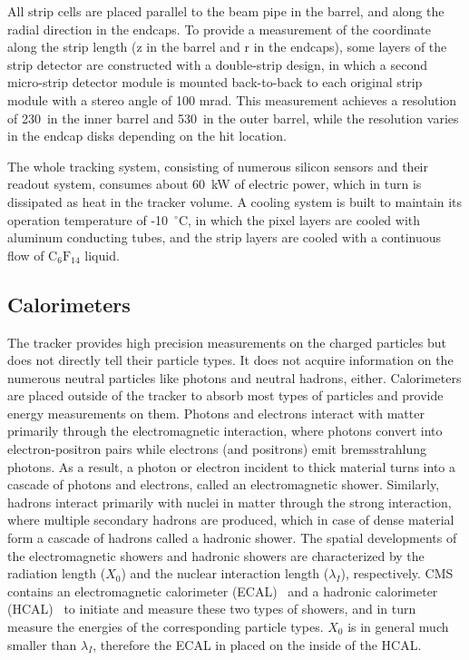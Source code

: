 All strip cells are placed parallel to the beam pipe in the barrel, and along the radial direction in the endcaps.
To provide a measurement of the coordinate along the strip length (z in the barrel and r in the endcaps),
some layers of the strip detector are constructed with a double-strip design, 
in which a second micro-strip detector module is mounted back-to-back to each original strip module with a stereo angle of 100 mrad. 
This measurement achieves a resolution of 230~\mum in the inner barrel and 530~\mum in the outer barrel, 
while the resolution varies in the endcap disks depending on the hit location.

The whole tracking system, consisting of numerous silicon sensors and their readout system,
consumes about 60~kW of electric power, which in turn is dissipated as heat in the tracker volume.
A cooling system is built to maintain its operation temperature of -10~${}^{\circ}$C, 
in which the pixel layers are cooled with aluminum conducting tubes, 
and the strip layers are cooled with a continuous flow of $\text{C}_{6}\text{F}_{14}$ liquid.


\subsection{Calorimeters}\label{sec:calos}

The tracker provides high precision measurements on the charged particles but does not directly tell their particle types.
It does not acquire information on the numerous neutral particles like photons and neutral hadrons, either.
Calorimeters are placed outside of the tracker to absorb most types of particles and provide energy measurements on them.
Photons and electrons interact with matter primarily through the electromagnetic interaction, 
where photons convert into electron-positron pairs while electrons (and positrons) emit bremsstrahlung photons.
As a result, a photon or electron incident to thick material turns into a cascade of photons and electrons, called an electromagnetic shower.
Similarly, hadrons interact primarily with nuclei in matter through the strong interaction,
where multiple secondary hadrons are produced, which in case of dense material form a cascade of hadrons called a hadronic shower.
The spatial developments of the electromagnetic showers and hadronic showers are characterized by the radiation length ($X_{0}$) and the nuclear interaction length ($\lambda_{I}$), respectively.
CMS contains an electromagnetic calorimeter (ECAL)~\cite{Collaboration_2008} and a hadronic calorimeter (HCAL)~\cite{Collaboration_2008, Mans:1481837} to initiate and measure these two types of showers,
and in turn measure the energies of the corresponding particle types.
$X_{0}$ is in general much smaller than $\lambda_{I}$, therefore the ECAL in placed on the inside of the HCAL.


